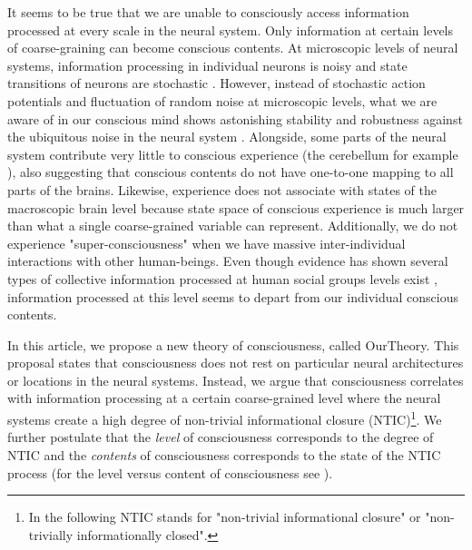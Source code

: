 \documentclass[utf8]{article}
\begin{document}
		It seems to be true that we are unable to consciously access information processed at every scale in the neural system. Only information at certain levels of coarse-graining can become conscious contents. At microscopic levels of neural systems, information processing in individual neurons is noisy and state transitions of neurons are stochastic \citep{Goldwyn2011, White2000}. However, instead of stochastic action potentials and fluctuation of random noise at microscopic levels, what we are aware of in our conscious mind shows astonishing stability and robustness against the ubiquitous noise in the neural system \citep{mathis1995computational}. Alongside, some parts of the neural system contribute very little to conscious experience (the cerebellum for example \citep{lemon2010life}), also suggesting that conscious contents do not have one-to-one mapping to all parts of the brains. Likewise, experience does not associate with states of the macroscopic brain level because state space of conscious experience is much larger than what a single coarse-grained variable can represent. Additionally, we do not experience "super-consciousness" when we have massive inter-individual interactions with other human-beings. Even though evidence has shown several types of collective information processed at human social groups levels exist \citep{malone2015handbook}, information processed at this level seems to depart from our individual conscious contents.


		In this article, we propose a new theory of consciousness, called \ac{OurTheory}. This proposal states that consciousness does not rest on particular neural architectures or locations in the neural systems. Instead, we argue that consciousness correlates with information processing at a certain coarse-grained level where the neural systems create a high degree of non-trivial informational closure (NTIC)\footnote{In the following NTIC stands for "non-trivial informational closure" or "non-trivially informationally closed".}. We further postulate that the \textit{level} of consciousness corresponds to the degree of NTIC and the \textit{contents} of consciousness corresponds to the state of the NTIC process (for the level versus content of consciousness see \cite{laureys2005neural, overgaard2010neural}).
		
\end{document}
